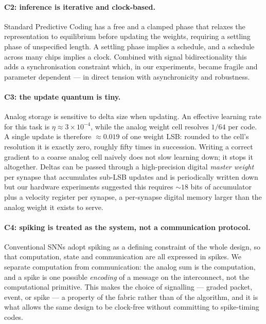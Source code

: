 \documentclass[11pt]{article}
\begin{document}
\hypertarget{c2-inference-is-iterative-and-clock-based.}{%
\paragraph{C2: inference is iterative and
clock-based.}\label{c2-inference-is-iterative-and-clock-based.}}

Standard Predictive Coding has a free and a clamped phase that relaxes
the representation to equilibrium before updating the weights, requiring
a settling phase of unspecified length. A settling phase implies a
schedule, and a schedule across many chips implies a clock. Combined
with signal bidirectionality this adds a synchronisation constraint
which, in our experiments, became fragile and parameter dependent --- in
direct tension with asynchronicity and robustness.

\hypertarget{c3-the-update-quantum-is-tiny.}{%
\paragraph{C3: the update quantum is
tiny.}\label{c3-the-update-quantum-is-tiny.}}

Analog storage is sensitive to delta size when updating. An effective
learning rate for this task is \(\eta \approx 3\times10^{-4}\), while
the analog weight cell resolves \(1/64\) per code. A single update is
therefore \(\approx 0.019\) of one weight LSB: rounded to the cell's
resolution it is exactly zero, roughly fifty times in succession.
Writing a correct gradient to a coarse analog cell naively does not slow
learning down; it stops it altogether. Deltas can be passed through a
high-precision digital \emph{master weight} per synapse that accumulates
sub-LSB updates and is periodically written down but our hardware
experiments suggested this requires \(\sim 18\) bits of accumulator plus
a velocity register per synapse, a per-synapse digital memory larger
than the analog weight it exists to serve.

\hypertarget{c4-spiking-is-treated-as-the-system-not-a-communication-protocol.}{%
\paragraph{C4: spiking is treated as the system, not a communication
protocol.}\label{c4-spiking-is-treated-as-the-system-not-a-communication-protocol.}}

Conventional SNNs adopt spiking as a defining constraint of the whole
design, so that computation, state and communication are all expressed
in spikes. We separate computation from communication: the analog sum is
the computation, and a spike is one possible \emph{encoding} of a
message on the interconnect, not the computational primitive. This makes
the choice of signalling --- graded packet, event, or spike --- a
property of the fabric rather than of the algorithm, and it is what
allows the same design to be clock-free without committing to
spike-timing codes.
\end{document}
